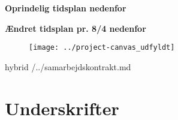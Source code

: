 \documentclass[12pt,fleqn,]{article}
\begin{document}
\textbf{Oprindelig tidsplan nedenfor}

 
 \textbf{Ændret tidsplan pr. 8/4 nedenfor}

\begin{figure}[H]
	\centering
	\texttt{[image: ../project-canvas\_udfyldt]}
\end{figure}
\thispagestyle{empty}
\newpage 

\begin{markdown*}{hybrid}
/../samarbejdskontrakt.md
\end{markdown*}

\section{Underskrifter}
\begin{figure}[H]
	\centering
\end{figure}
\end{document}
